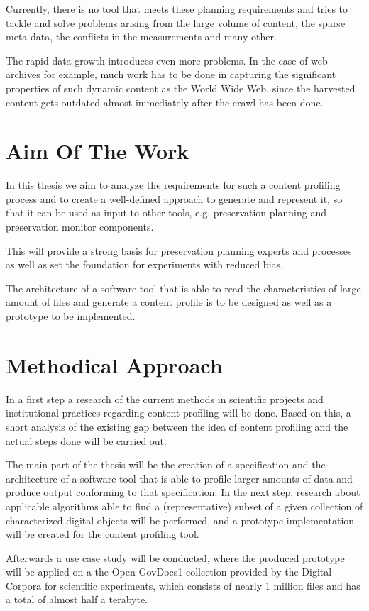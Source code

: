 Currently, there is no tool that meets these planning requirements and tries to tackle and solve problems arising from the large volume of content, the sparse meta data, the conflicts in the measurements and many other.

The rapid data growth introduces even more problems. In the case of web archives for example, much work has to be done in capturing the significant properties of such dynamic content as the World Wide Web, since the harvested content gets outdated almost immediately after the crawl has been done.

\section{Aim Of The Work}
\label{sec:aim_of_the_work}
In this thesis we aim to analyze the requirements for such a content profiling process and to create a well-defined approach to generate and represent it, so that it can be used as input to other tools, e.g. preservation planning and preservation monitor components.

This will provide a strong basis for preservation planning experts and processes as well as set the foundation for experiments with reduced bias.

The architecture of a software tool that is able to read the characteristics of large amount of files and generate a content profile is to be designed as well as a prototype to be implemented. 

\section{Methodical Approach}
\label{sec:methodical_approach}
In a first step a research of the current methods in scientific projects and institutional practices regarding content profiling will be done. Based on this, a short analysis of the existing gap between the idea of content profiling and the actual steps done will be carried out. 

The main part of the thesis will be the creation of a specification and the architecture of a software tool that is able to profile larger amounts of data and produce output conforming to that specification. In the next step, research about applicable algorithms able to find a (representative) subset of a given collection of characterized digital objects will be performed, and a prototype implementation will be created for the content profiling tool. 

Afterwards a use case study will be conducted, where the produced prototype will be applied on a the Open GovDocs1 collection provided by the Digital Corpora for scientific experiments, which consists of nearly 1 million files and has a total of almost half a terabyte. 

